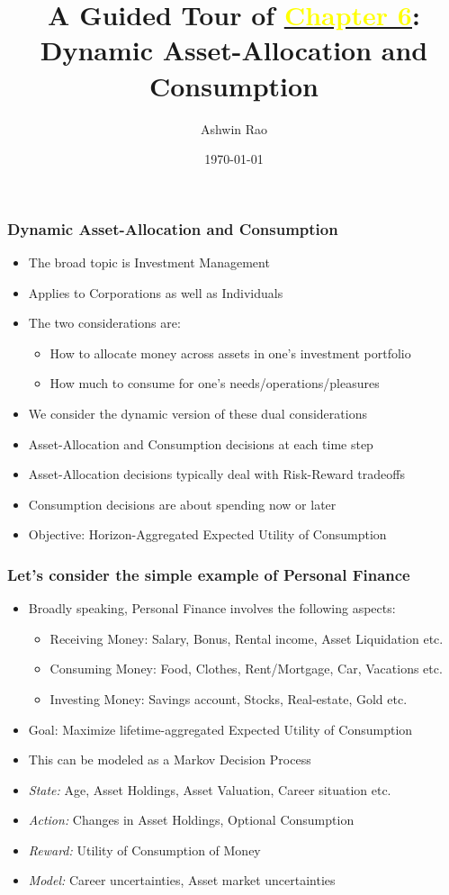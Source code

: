 \documentclass[handout]{beamer}
\title[Asset-Allocation Chapter]{A Guided Tour of \href{http://stanford.edu/~ashlearn/RLForFinanceBook/book.pdf}{\underline{\textcolor{yellow}{Chapter 6}}}: \\  Dynamic Asset-Allocation and Consumption}
\author{Ashwin Rao} %
\institute[Stanford] %
{
ICME, Stanford University
}
\date{\today} %
\begin{document}
\begin{frame}
\titlepage %
\end{frame}

\begin{frame}
\frametitle{Dynamic Asset-Allocation and Consumption}
\pause
\begin{itemize}[<+->]
\item The broad topic is Investment Management
\item Applies to Corporations as well as Individuals
\item The two considerations are:
\pause
\begin{itemize}[<+->]
\item How to allocate money across assets in one's investment portfolio
\item How much to consume for one's needs/operations/pleasures
\end{itemize}
\item We consider the dynamic version of these dual considerations
\item Asset-Allocation and Consumption decisions at each time step
\item Asset-Allocation decisions typically deal with Risk-Reward tradeoffs
\item Consumption decisions are about spending now or later
\item Objective: Horizon-Aggregated Expected Utility of Consumption
\end{itemize}
\end{frame}

\begin{frame}
\frametitle{Let's consider the simple example of Personal Finance}
\pause
\begin{itemize}[<+->]
\item Broadly speaking, Personal Finance involves the following aspects:
\pause
\begin{itemize}[<+->]
\item Receiving Money: Salary, Bonus, Rental income, Asset Liquidation etc.
\item Consuming Money: Food, Clothes, Rent/Mortgage, Car, Vacations etc.
\item Investing Money: Savings account, Stocks, Real-estate, Gold etc.
\end{itemize}
\item Goal: Maximize lifetime-aggregated Expected Utility of Consumption
\item This can be modeled as a Markov Decision Process
\item {\em State:} Age, Asset Holdings, Asset Valuation, Career situation etc.
\item {\em Action:} Changes in Asset Holdings, Optional Consumption
\item {\em Reward:} Utility of Consumption of Money
\item {\em Model:} Career uncertainties, Asset market uncertainties
\end{itemize}
\end{frame}
\end{document}
